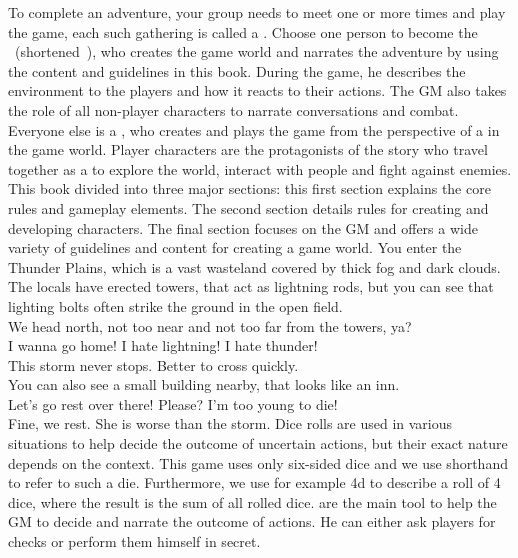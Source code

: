 To complete an adventure, your group needs to meet one or more times and play the game, each such gathering is called a .
%
\ofpar
%
Choose one person to become the ~(shortened~), who creates the game world and narrates the adventure by using the content and guidelines in this book.
During the game, he describes the environment to the players and how it reacts to their actions. 
The GM also takes the role of all non-player characters to narrate conversations and combat. 
Everyone else is a , who creates and plays the game from the perspective of a  in the game world.
Player characters are the protagonists of the story who travel together as a  to explore the world, interact with people and fight against enemies. 
This book divided into three major sections: this first section explains the core rules and gameplay elements.
The second section details rules for creating and developing characters.
The final section focuses on the GM and offers a wide variety of guidelines and content for creating a game world. 
%
\vfill
%
{
	\newcommand{\nl}{\vspace{0.2cm}\\}
	 You enter the Thunder Plains, which is a vast wasteland covered by thick fog and dark clouds.
	The locals have erected towers, that act as lightning rods, but you can see that lighting bolts often strike the ground in the open field.\nl
	 We head north, not too near and not too far from the towers, ya?\nl
	 I wanna go home! I hate lightning! I hate thunder!\nl
	 This storm never stops. Better to cross quickly.\nl
	 You can also see a small building nearby, that looks like an inn.\nl
	 Let’s go rest over there! Please? I'm too young to die!\nl
	 Fine, we rest. She is worse than the storm.
}
%
\vfill
%
Dice rolls are used in various situations to help decide the outcome of uncertain actions, but their exact nature depends on the context. 
This game uses only six-sided dice and we use  shorthand to refer to such a die.
Furthermore, we use for example 4d to describe a roll of 4 dice, where the result is the sum of all rolled dice.
 are the main tool to help the GM to decide and narrate the outcome of actions.
He can either ask players for checks or perform them himself in secret.
